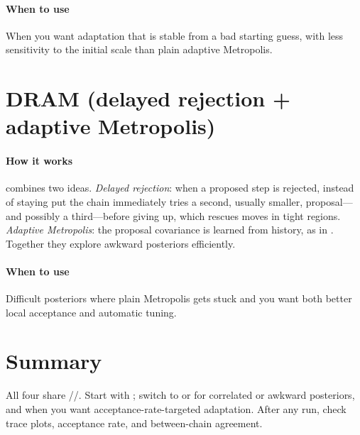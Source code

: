 \paragraph{When to use} When you want adaptation that is stable from a bad starting guess, with
less sensitivity to the initial scale than plain adaptive Metropolis.

\section{DRAM (delayed rejection + adaptive Metropolis)}
\label{sec:s-dram}

\paragraph{How it works}  combines two ideas. \emph{Delayed rejection}: when a
proposed step is rejected, instead of staying put the chain immediately tries a second, usually
smaller, proposal---and possibly a third---before giving up, which rescues moves in tight regions.
\emph{Adaptive Metropolis}: the proposal covariance is learned from history, as in
. Together they explore awkward posteriors efficiently.

\paragraph{When to use} Difficult posteriors where plain Metropolis gets stuck and you want both
better local acceptance and automatic tuning.

\section{Summary}
\label{sec:mcmc1-summary}

All four share //. Start with
; switch to  or  for correlated or awkward posteriors,
and  when you want acceptance-rate-targeted adaptation. After any run, check
trace plots, acceptance rate, and between-chain agreement.
